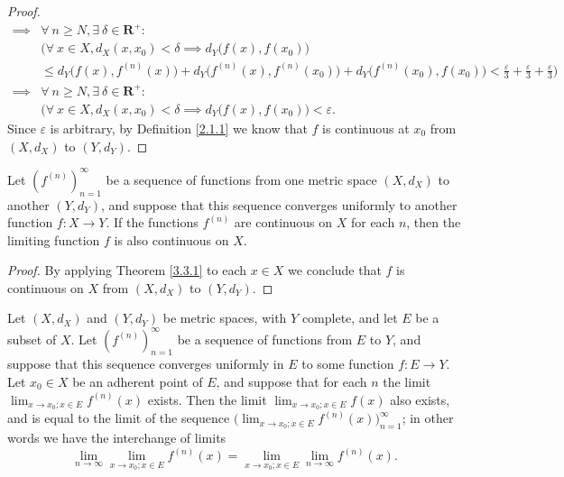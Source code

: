 \begin{proof}
\begin{align*}
        \implies & \forall\ n \geq N, \exists\ \delta \in \mathbf{R}^+ :                                                                                                                                       \\
                 & \Big(\forall\ x \in X, d_X(x, x_0) < \delta \implies d_Y\big(f(x), f(x_0)\big)                                                                                                              \\
                 & \leq d_Y\big(f(x), f^{(n)}(x)\big) + d_Y\big(f^{(n)}(x), f^{(n)}(x_0)\big) + d_Y\big(f^{(n)}(x_0), f(x_0)\big) < \frac{\varepsilon}{3} + \frac{\varepsilon}{3} + \frac{\varepsilon}{3}\Big) \\
        \implies & \forall\ n \geq N, \exists\ \delta \in \mathbf{R}^+ :                                                                                                                                       \\
                 & \Big(\forall\ x \in X, d_X(x, x_0) < \delta \implies d_Y\big(f(x), f(x_0)\big) < \varepsilon.
    \end{align*}
    Since \(\varepsilon\) is arbitrary, by Definition \ref{2.1.1} we know that \(f\) is continuous at \(x_0\) from \((X, d_X)\) to \((Y, d_Y)\).
\end{proof}

\begin{corollary}\label{3.3.2}
    Let \((f^{(n)})_{n = 1}^\infty\) be a sequence of functions from one metric space \((X, d_X)\) to another \((Y, d_Y)\), and suppose that this sequence converges uniformly to another function \(f : X \to Y\).
    If the functions \(f^{(n)}\) are continuous on \(X\) for each \(n\), then the limiting function \(f\) is also continuous on \(X\).
\end{corollary}

\begin{proof}
    By applying Theorem \ref{3.3.1} to each \(x \in X\) we conclude that \(f\) is continuous on \(X\) from \((X, d_X)\) to \((Y, d_Y)\).
\end{proof}

\begin{proposition}\label{3.3.3}
    Let
    \((X, d_X)\) and \((Y, d_Y)\) be metric spaces, with \(Y\) complete, and let \(E\) be a subset of \(X\).
    Let \((f^{(n)})_{n = 1}^\infty\) be a sequence of functions from \(E\) to \(Y\), and suppose that this sequence converges uniformly in \(E\) to some function \(f : E \to Y\).
    Let \(x_0 \in X\) be an adherent point of \(E\), and suppose that for each \(n\) the limit \(\lim_{x \to x_0 ; x \in E} f^{(n)}(x)\) exists.
    Then the limit \(\lim_{x \to x_0 ; x \in E} f(x)\) also exists, and is equal to the limit of the sequence \(\big(\lim_{x \to x_0 ; x \in E} f^{(n)}(x)\big)_{n = 1}^\infty\);
    in other words we have the interchange of limits
    \[
        \lim_{n \to \infty} \lim_{x \to x_0 ; x \in E} f^{(n)}(x) = \lim_{x \to x_0 ; x \in E} \lim_{n \to \infty} f^{(n)}(x).
    \]
\end{proposition}

